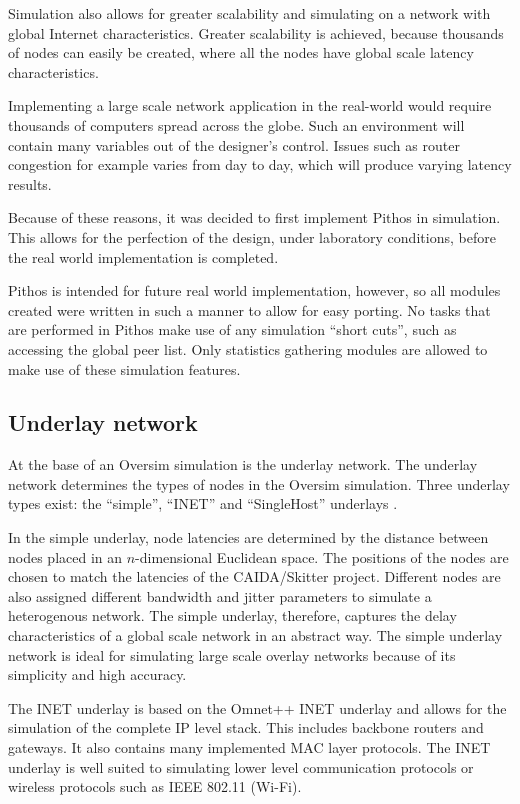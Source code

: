 Simulation also allows for greater scalability and simulating on a network with global Internet characteristics. Greater scalability is achieved, because thousands of nodes can easily be created, where all the nodes have global scale latency characteristics.

Implementing a large scale network application in the real-world would require thousands of computers spread across the globe. Such an environment will contain many variables out of the designer's control. Issues such as router congestion for example varies from day to day, which will produce varying latency results.

Because of these reasons, it was decided to first implement Pithos in simulation. This allows for the perfection of the design, under laboratory conditions, before the real world implementation is completed.

Pithos is intended for future real world implementation, however, so all modules created were written in such a manner to allow for easy porting. No tasks that are performed in Pithos make use of any simulation ``short cuts'', such as accessing the global peer list. Only statistics gathering modules are allowed to make use of these simulation features.


    \subsection{Underlay network}

At the base of an Oversim simulation is the underlay network. The underlay network determines the types of nodes in the Oversim simulation. Three underlay types exist: the ``simple'', ``INET'' and ``SingleHost'' underlays \cite{oversim_applications}.

In the simple underlay, node latencies are determined by the distance between nodes placed in an $n$-dimensional Euclidean space. The positions of the nodes are chosen to match the latencies of the CAIDA/Skitter project. Different nodes are also assigned different bandwidth and jitter parameters to simulate a heterogenous network. The simple underlay, therefore, captures the delay characteristics of a global scale network in an abstract way. The simple underlay network is ideal for simulating large scale overlay networks because of its simplicity and high accuracy.

The INET underlay is based on the Omnet++ INET underlay and allows for the simulation of the complete IP level stack. This includes backbone routers and gateways. It also contains many implemented MAC layer protocols. The INET underlay is well suited to simulating lower level communication protocols or wireless protocols such as IEEE 802.11 (Wi-Fi).

